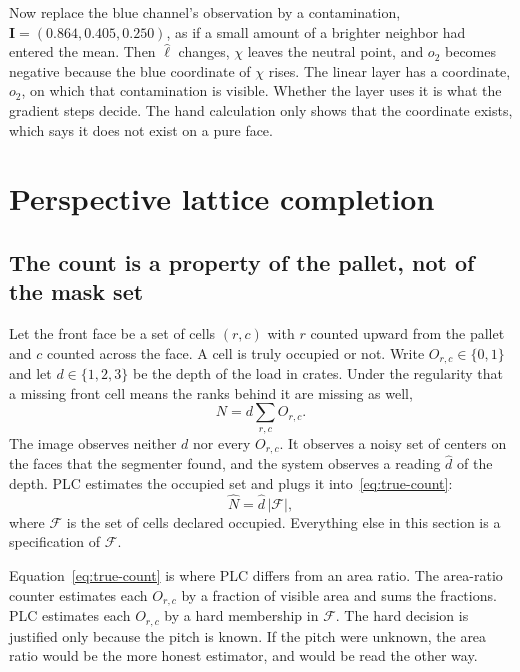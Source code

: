 Now replace the blue channel's observation by a contamination, $\mathbf{I}=(0.864,0.405,0.250)$, as if a small amount of a brighter neighbor had entered the mean. Then $\hat{\ell}$ changes, $\chi$ leaves the neutral point, and $o_{2}$ becomes negative because the blue coordinate of $\chi$ rises. The linear layer has a coordinate, $o_2$, on which that contamination is visible. Whether the layer uses it is what the gradient steps decide. The hand calculation only shows that the coordinate exists, which  says it does not exist on a pure face.



\section{Perspective lattice completion}
\label{sec:plc}



\subsection{The count is a property of the pallet, not of the mask set}
\label{sec:plc-count}

Let the front face be a set of cells $(r,c)$ with $r$ counted upward from the pallet and $c$ counted across the face. A cell is truly occupied or not. Write $O_{r,c}\in\{0,1\}$ and let $d\in\{1,2,3\}$ be the depth of the load in crates. Under the regularity that a missing front cell means the ranks behind it are missing as well,
\begin{equation}
N = d \sum_{r,c} O_{r,c}.
\label{eq:true-count}
\end{equation}
The image observes neither $d$ nor every $O_{r,c}$. It observes a noisy set of centers on the faces that the segmenter found, and the system observes a reading $\hat{d}$ of the depth. PLC estimates the occupied set and plugs it into~\eqref{eq:true-count}:
\begin{equation}
\hat{N} = \hat{d}\, \lvert\mathcal{F}\rvert,
\label{eq:plc-count}
\end{equation}
where $\mathcal{F}$ is the set of cells declared occupied. Everything else in this section is a specification of $\mathcal{F}$.

Equation~\eqref{eq:true-count} is where PLC differs from an area ratio. The area-ratio counter estimates each $O_{r,c}$ by a fraction of visible area and sums the fractions. PLC estimates each $O_{r,c}$ by a hard membership in $\mathcal{F}$. The hard decision is justified only because the pitch is known. If the pitch were unknown, the area ratio would be the more honest estimator, and  would be read the other way.

